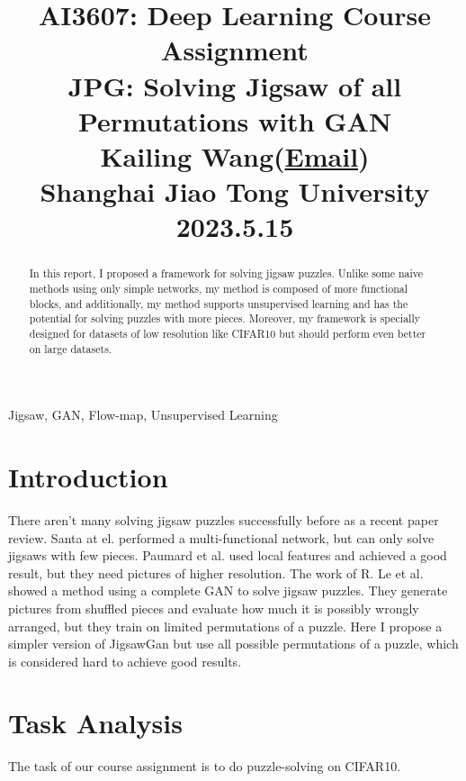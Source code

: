 \documentclass[conference]{IEEEtran}
\begin{document}
	
	\title{AI3607: Deep Learning Course Assignment \\ JPG: Solving Jigsaw of all Permutations with GAN  \\
		{\normalsize \vspace{1em} Kailing Wang(\href{mailto:wangkailing151@gmail.com}{Email}) \\ Shanghai Jiao Tong University \\ 2023.5.15}
	}
	
	\maketitle
	
	\begin{abstract}
		In this report, I proposed a framework for solving jigsaw puzzles. Unlike some naive methods using only simple networks, my method is composed of more functional blocks, and additionally, my method supports unsupervised learning and has the potential for solving puzzles with more pieces. Moreover, my framework is specially designed for datasets of low resolution like CIFAR10 but should perform even better on large datasets.
	\end{abstract}
	
	\begin{IEEEkeywords}
		Jigsaw, GAN, Flow-map, Unsupervised Learning
	\end{IEEEkeywords}
	
	\section{\textbf{Introduction}}
	There aren't many solving jigsaw puzzles successfully before as a recent paper review\cite{0}. Santa at el. performed a multi-functional network\cite{1}, but can only solve jigsaws with few pieces. Paumard et al. used local features and achieved a good result\cite{2}, but they need pictures of higher resolution. The work of R. Le et al. showed a method using a complete GAN to solve jigsaw puzzles\cite{3}. They generate pictures from shuffled pieces and evaluate how much it is possibly wrongly arranged, but they train on limited permutations of a puzzle. Here I propose a simpler version of JigsawGan but use all possible permutations of a puzzle, which is considered hard to achieve good results. 
	
	\section{Task Analysis}
	The task of our course assignment is to do puzzle-solving on CIFAR10. 
\end{document}

